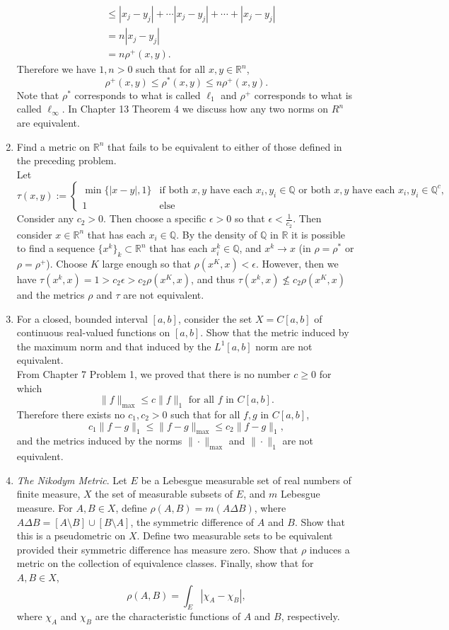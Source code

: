 \begin{enumerate}
\begin{align*}
        &\le |x_j-y_j| + \cdots|x_j-y_j|+\cdots + |x_j-y_j|\\
        &= n|x_j-y_j|\\
        &=n\rho^+(x,y).
    \end{align*}
    Therefore we have $1,n>0$ such that for all $x,y\in \mathbb{R}^n$,
    \[
        \rho^+(x,y)\le\rho^*(x,y)\le n\rho^+(x,y).
    \]
    Note that $\rho^*$ corresponds to what is called $\ell_1$ and $\rho^+$ corresponds to what is called $\ell_\infty$.
    In Chapter 13 Theorem 4 we discuss how any two norms on $R^n$ are equivalent.
    \item Find a metric on $\mathbb{R}^n$ that fails to be equivalent to either of those defined in the preceding problem.\\
    Let 
    \[
    \tau(x,y):=
    \begin{cases}
        \min\{|x-y|,1\}&\text{if both $x,y$ have each $x_i,y_i\in\mathbb{Q}$ or both $x,y$ have each $x_i,y_i\in\mathbb{Q}^c$,}\\
        1&\text{else}
    \end{cases}    
    \]
    Consider any $c_2>0$.
    Then choose a specific $\epsilon>0$ so that $\epsilon<\frac{1}{c_2}$.
    Then consider $x\in\mathbb{R}^n$ that has each $x_i\in\mathbb{Q}$.
    By the density of $\mathbb{Q}$ in $\mathbb{R}$ it is possible to find a sequence $\{x^k\}_k\subset \mathbb{R}^n$ that has each $x_i^k\in\mathbb{Q}$, and $x^k\to x$ (in $\rho=\rho^*$ or $\rho=\rho^+$).
    Choose $K$ large enough so that $\rho(x^K,x)<\epsilon$.
    However, then we have $\tau(x^k,x)=1>c_2\epsilon>c_2\rho(x^K,x)$, and thus $\tau(x^k,x)\not\le c_2\rho(x^K,x)$ and the metrics $\rho$ and $\tau$ are not equivalent.

    \item For a closed, bounded interval $[a,b]$, consider the set $X=C[a,b]$ of continuous real-valued functions on $[a,b]$.
    Show that the metric induced by the maximum norm and that induced by the $L^1[a,b]$ norm are not equivalent.\\
    From Chapter 7 Problem 1, we proved that there is no number $c \ge 0$ for which
	\[
	\| f \|_{\max}	\le c \| f \|_1 \text{ for all $f$ in $C[a,b]$}.
	\]
    Therefore there exists no $c_1,c_2>0$ such that for all $f,g$ in $C[a,b]$,
    \[
        c_1\| f-g \|_1 \le \| f-g \|_{\max}	\le c_2 \| f-g \|_1,
	\]
    and the metrics induced by the norms $\| \cdot \|_{\max}$ and $\| \cdot \|_1$ are not equivalent.
    \item \textit{The Nikodym Metric}. Let $E$ be a Lebesgue measurable set of real numbers of finite measure, $X$ the set of measurable subsets of $E$, and $m$ Lebesgue measure.
    For $A,B\in X$, define $\rho(A,B)=m(A\Delta B)$, where $A\Delta B = [A\setminus B]\cup[B\setminus A]$, the symmetric difference of $A$ and $B$.
    Show that this is a pseudometric on $X$.
    Define two measurable sets to be equivalent provided their symmetric difference has measure zero.
    Show that $\rho$ induces a metric on the collection of equivalence classes.
    Finally, show that for $A,B\in X$, 
    \[
    \rho(A,B)=\int_E|\chi_A-\chi_B|,    
    \]
    where $\chi_A$ and $\chi_B$ are the characteristic functions of $A$ and $B$, respectively.
    

\end{enumerate}
